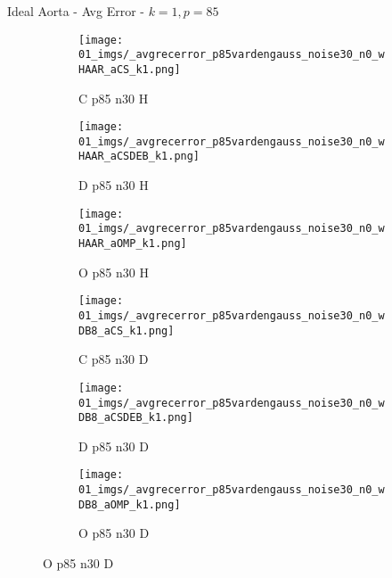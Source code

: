 \begin{frame}{Ideal Aorta - Avg Error - $k=1,p=85$}{}
\begin{figure}
\begin{subfigure}{0.13\textwidth}
\texttt{[image: 01\_imgs/\_avgrecerror\_p85vardengauss\_noise30\_n0\_wHAAR\_aCS\_k1.png]}
\caption*{\tiny C p85 n30 H}
\end{subfigure}
\begin{subfigure}{0.13\textwidth}
\texttt{[image: 01\_imgs/\_avgrecerror\_p85vardengauss\_noise30\_n0\_wHAAR\_aCSDEB\_k1.png]}
\caption*{\tiny D p85 n30 H}
\end{subfigure}
\begin{subfigure}{0.13\textwidth}
\texttt{[image: 01\_imgs/\_avgrecerror\_p85vardengauss\_noise30\_n0\_wHAAR\_aOMP\_k1.png]}
\caption*{\tiny O p85 n30 H}
\end{subfigure}
\begin{subfigure}{0.13\textwidth}
\texttt{[image: 01\_imgs/\_avgrecerror\_p85vardengauss\_noise30\_n0\_wDB8\_aCS\_k1.png]}
\caption*{\tiny C p85 n30 D}
\end{subfigure}
\begin{subfigure}{0.13\textwidth}
\texttt{[image: 01\_imgs/\_avgrecerror\_p85vardengauss\_noise30\_n0\_wDB8\_aCSDEB\_k1.png]}
\caption*{\tiny D p85 n30 D}
\end{subfigure}
\begin{subfigure}{0.13\textwidth}
\texttt{[image: 01\_imgs/\_avgrecerror\_p85vardengauss\_noise30\_n0\_wDB8\_aOMP\_k1.png]}
\caption*{\tiny O p85 n30 D}
\end{subfigure}
\end{figure}
\end{frame}

